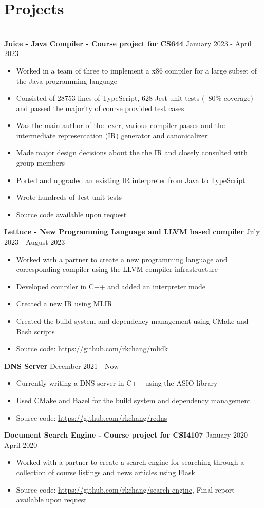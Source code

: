 \documentclass{article}
\begin{document}
\section{Projects}
\hrulefill \\
\textbf{Juice - Java Compiler - Course project for CS644} \hfill January 2023 - April 2023
\begin{itemize}[noitemsep]
    \item Worked in a team of three to implement a x86 compiler for a large subset of the Java programming language
    \item Consisted of 28753 lines of TypeScript, 628 Jest unit tests (~80\% coverage) and passed the majority of course provided test cases
    \item Was the main author of the lexer, various compiler passes and the intermediate representation (IR) generator and canonicalizer
    \item Made major design decisions about the the IR and closely consulted with group members
    \item Ported and upgraded an existing IR interpreter from Java to TypeScript
    \item Wrote hundreds of Jest unit tests
    \item Source code available upon request
\end{itemize}

\textbf{Lettuce - New Programming Language and LLVM based compiler} \hfill July 2023 - August 2023
\begin{itemize}[noitemsep]
    \item Worked with a partner to create a new programming language and corresponding compiler using the LLVM compiler infrastructure
    \item Developed compiler in C++ and added an interpreter mode
    \item Created a new IR using MLIR
    \item Created the build system and dependency management using CMake and Bash scripts
    \item Source code: \url{https://github.com/rkchang/mlidk}
\end{itemize}

\textbf{DNS Server} \hfill December 2021 - Now
\begin{itemize}[noitemsep]
    \item Currently writing a DNS server in C++ using the ASIO library
    \item Used CMake and Bazel for the build system and dependency management
    \item Source code: \url{https://github.com/rkchang/rcdns}
\end{itemize}

\textbf{Document Search Engine - Course project for CSI4107} \hfill January 2020 - April 2020
\begin{itemize}[noitemsep]
    \item Worked with a partner to create a search engine for searching through a collection of course listings and news articles using Flask
    \item Source code: \url{https://github.com/rkchang/search-engine}, Final report available upon request
\end{itemize}
\end{document}
